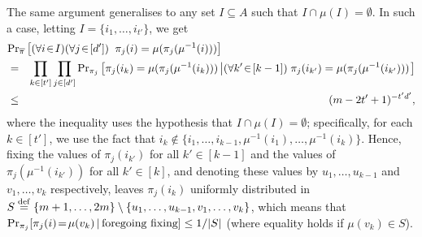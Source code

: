 \documentclass[10pt,a4paper]{article}
\theoremstyle{definition}
\newcommand{\prob}{{\rm Pr}}
\newcommand{\imu}{{\mu^{-1}}}
\newcommand{\eqdef}{\stackrel{\rm def}{=}}
\newcommand{\ov}{\overline}
\begin{document}
%
%
%
%
The same argument generalises to any set $I\subseteq A$
such that $I\cap\mu(I)=\emptyset$.
In such a case, letting $I=\{i_1,\ldots,i_{t'}\}$, we get
\begin{eqnarray*}
\lefteqn{\prob_{\ov\pi}\left[(\forall i\!\in\!I)(\forall j\!\in\![d'])\;\;
                     \pi_j(i)=\mu(\pi_j(\imu(i)))\right]} \\
&=& \prod_{k\in[t']}\prod_{j\in[d']}
    \prob_{\pi_j}\left[\pi_j(i_k)=\mu(\pi_j(\imu(i_k)))
          \left|(\forall k'\!\in\![k-1])\;
                   \pi_j(i_{k'})=\mu(\pi_j(\imu(i_{k'})))\right.\right] \\
&\leq& (m-2t'+1)^{-t'd'},
\end{eqnarray*}
where the inequality uses the hypothesis that $I\cap\mu(I)=\emptyset$;
specifically, for each $k\in[t']$, we use the fact
that $i_k\not\in\{i_1,\ldots,i_{k-1},\imu(i_1),\ldots,\imu(i_{k})\}$.
%
Hence, fixing the values of $\pi_j(i_{k'})$ for all $k'\in[k-1]$
and the values of $\pi_j(\imu(i_{k'}))$ for all $k'\in[k]$,
and denoting these values
by $u_1,\ldots,u_{k-1}$ and $v_1,\ldots,v_{k}$ respectively,
leaves $\pi_j(i_k)$ uniformly distributed
in $S\eqdef\{m+1,\ldots,2m\}\setminus\{u_1,\ldots,u_{k-1},v_1,\ldots,v_k\}$,
which means that
$\prob_{\pi_j}[\pi_j(i)\!=\!\mu(v_k)\,|\,\mbox{\rm foregoing fixing}]\leq1/|S|$
(where equality holds if $\mu(v_k)\in S$).
%
%
%
%
%
%
%
\end{document}
